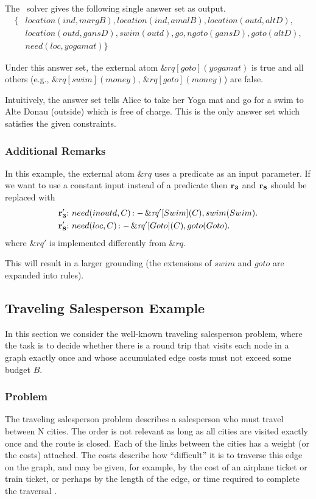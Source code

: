 \documentclass[a4paper, titlepage]{article}
\newcommand{\ext}[3]{\ensuremath{\&{\mathit{#1}}[#2](#3)}}
\DeclareMathOperator{\leftimpl}{:-}
\newcommand{\row}[1]{%
  \ensuremath{\color{black}\ensuremath{\mathbf{#1}} \color{black}}%
}
\newcommand{\rowprefix}[1]{%
  \ensuremath{\color{black}\mathbf{#1{:}}\ }%
}
\begin{document}
\noindent
The \dlvhex\ solver gives the following single answer set as output.
\begin{align*}
\{ & location(ind,margB),location(ind,amalB),location(outd,altD), \\
   & location(outd,gansD), swim(outd),go,ngoto(gansD),goto(altD),\\
   & need(loc,yogamat) \} 
\end{align*}

Under this answer set, the external atom
$\ext{rq}{goto}{yogamat}$ is true and all others
(e.g., $\ext{rq}{swim}{money}$, $\ext{rq}{goto}{money}$)
are false.

Intuitively, the answer set tells Alice to 
take her Yoga mat and go for a swim to Alte Donau (outside) 
which is free of charge. This is the only answer set which 
satisfies the given constraints.    

\subsubsection{Additional Remarks}

In this example, the external atom 
$\mathit{\&rq}$ uses a predicate as an input parameter.
If we want to use a constant input
instead of a predicate then
\row{r_3} and \row{r_8} should be replaced with
\begin{align*}
\rowprefix{r_3'}& need(inoutd, C) \leftimpl \ext{rq'}{Swim}{C}, swim(Swim). \\
\rowprefix{r_8'}& need(loc, C) \leftimpl \ext{rq'}{Goto}{C}, goto(Goto).
\end{align*}    
where $\&rq'$ is implemented differently from $\&rq$.

This will result in a larger grounding
(the extensions of $swim$ and $goto$ are expanded into rules).

\subsection{Traveling Salesperson Example}
\label{sec:traveling}
In this section we consider the well-known traveling 
salesperson problem, where the task is to decide whether there 
is a round trip that visits each node in a graph exactly 
once and whose accumulated edge costs must not exceed some 
budget $B$.

\subsubsection{Problem}
The traveling salesperson problem describes a salesperson who 
must travel between N cities. The order is not relevant as long as all cities are visited exactly once and the route is closed. Each of the 
links between the cities has a weight (or the 
costs) attached. The costs describe how ``difficult'' it is to 
traverse this edge on the graph, and may be given, for 
example, by the cost of an airplane ticket or train ticket, 
or perhaps by the length of the edge, or time required to 
complete the traversal \cite{wiki}.
\end{document}
